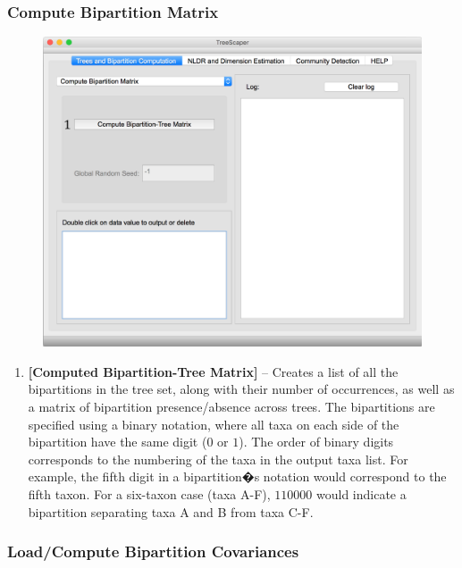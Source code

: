 \documentclass[11pt]{article}
\begin{document}
\newpage
\subsubsection{Compute Bipartition Matrix}\label{subsubsect:CompBipartMatrix}

\begin{figure}[thbp!]\centering
\includegraphics[scale=0.4]{imagesForManual/Figure7_6_1_2.png}
\end{figure}

\begin{enumerate}[{\bf 1-}]
\item {\bf [Computed Bipartition-Tree Matrix]} -- Creates a list of all the bipartitions in the tree set,
along with their number of occurrences, as well as a matrix of bipartition presence/absence
across trees. The bipartitions are specified using a binary notation, where all taxa on each side
of the bipartition have the same digit ($0$ or $1$). The order of binary digits corresponds to the
numbering of the taxa in the output taxa list. For example, the fifth digit in a bipartition�s
notation would correspond to the fifth taxon. For a six-taxon case (taxa A-F), $110000$ would
indicate a bipartition separating taxa A and B from taxa C-F.
\end{enumerate}


\newpage
\subsubsection{Load/Compute Bipartition Covariances}\label{subsubsect:LoadCompBipartCov}
\end{document}
